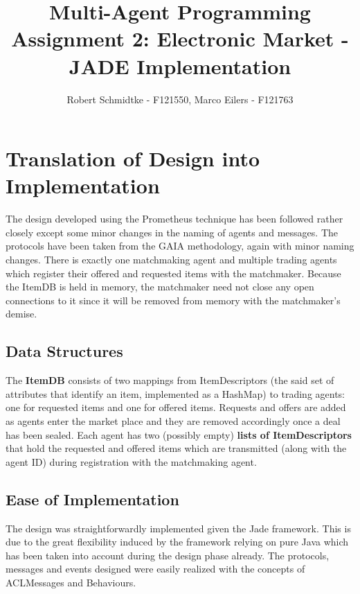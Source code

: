 \documentclass[a4paper,11pt]{article}
\begin{document}
\title{Multi-Agent Programming\\Assignment 2: Electronic Market - JADE Implementation}
\author{Robert Schmidtke - F121550, Marco Eilers - F121763}

\maketitle
\newpage

\section{Translation of Design into Implementation}
The design developed using the Prometheus technique has been followed rather closely except some minor changes in the naming of agents and messages. The protocols have been taken from the GAIA methodology, again with minor naming changes. There is exactly one matchmaking agent and multiple trading agents which register their offered and requested items with the matchmaker. Because the ItemDB is held in memory, the matchmaker need not close any open connections to it since it will be removed from memory with the matchmaker's demise.

\subsection{Data Structures}
The \textbf{ItemDB} consists of two mappings from ItemDescriptors (the said set of attributes that identify an item, implemented as a HashMap) to trading agents: one for requested items and one for offered items. Requests and offers are added as agents enter the market place and they are removed accordingly once a deal has been sealed. Each agent has two (possibly empty) \textbf{lists of ItemDescriptors} that hold the requested and offered items which are transmitted (along with the agent ID) during registration with the matchmaking agent.

\subsection{Ease of Implementation}
The design was straightforwardly implemented given the Jade framework. This is due to the great flexibility induced by the framework relying on pure Java which has been taken into account during the design phase already. The protocols, messages and events designed were easily realized with the concepts of ACLMessages and Behaviours.
\end{document}
